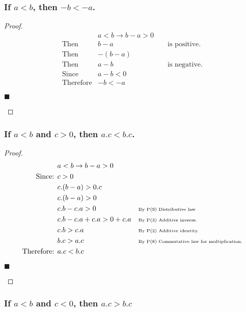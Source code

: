 \documentclass[letterpaper, 10 pt, conference]{ieeeconf}  %
\begin{document}
\subsubsection{\textbf{If $a < b$, then $-b < -a$.}}

\begin{proof}
\begin{align}
    &a < b \rightarrow b - a > 0 &&\\
    \text{Then } &b - a &&\text{ is positive.} \\
    \text{Then } &-(b - a) &&\\
    \text{Then } &a - b&& \text{ is negative.} \\
    \text{Since } & a - b < 0 && \\
    \text{Therefore} & -b < -a &&
\end{align}
\begin{flushright}
$\blacksquare$
\end{flushright}
\end{proof}

\subsubsection{\textbf{If $a < b$ and $c > 0$, then $a.c < b.c$.}}
\begin{proof}
\begin{align}
    &a < b \rightarrow b - a > 0 &&\\
    \text{Since: } & c > 0 && \\
    & c.(b - a) > 0.c && \\
    & c.(b - a) > 0 && \\
    & c.b - c.a > 0 && \text{\tiny{By P(9) Distributive law}}\\
    & c.b - c.a + c.a > 0 + c.a && \text{\tiny{By P(3) Additive inverse.}}\\
    & c.b > c.a && \text{\tiny{By P(2) Additive identity.}}\\
    &b.c > a.c && \text{\tiny{By P(8) Commutative law for multiplication.}} \\
    \text{Therefore: } & a.c < b.c&&
\end{align}
\begin{flushright}
$\blacksquare$
\end{flushright}
\end{proof}

\subsubsection{\textbf{If $a < b$ and $c < 0$, then $a.c > b.c$}}
\end{document}
